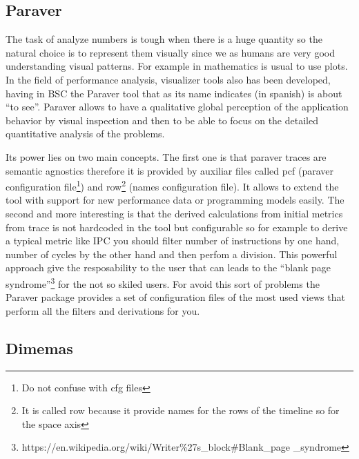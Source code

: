 \subsection{Paraver}

The task of analyze numbers is tough when there is a huge quantity so
the natural choice is to represent them visually since we as humans are very
good understanding visual patterns. For example in mathematics
is usual to use plots. In the field of performance analysis, visualizer tools
also has been developed, having in BSC the Paraver tool that as its name indicates
(in spanish) is  about ``to see''. Paraver allows to have a qualitative global 
perception of the application behavior by visual inspection and then to be able 
to focus on the detailed quantitative analysis of the problems.

Its power lies on two main concepts. The first one is that paraver traces are
semantic agnostics therefore it is provided by auxiliar files called pcf (paraver
configuration file\footnote{Do not confuse with cfg files}) and row\footnote{It 
is called row because it provide names for the rows of the timeline so for the 
space axis} (names configuration file). It allows to extend the tool with
support for new performance data or programming models easily. The second and
more interesting is that the derived calculations from initial metrics from trace is
not hardcoded in the tool but configurable so for example to derive a typical
metric like IPC you should filter number of
instructions by one hand, number of cycles by the other hand and then perfom a
division. This powerful approach give the resposability to the user that can
leads to the ``blank page
syndrome''\footnote{https://en.wikipedia.org/wiki/Writer\%27s\_block\#Blank\_page
\_syndrome} for the not so skiled users. For avoid this
sort of problems the Paraver package provides a set of configuration files of
the most used views that perform all the filters and derivations for you.

\subsection{Dimemas}


